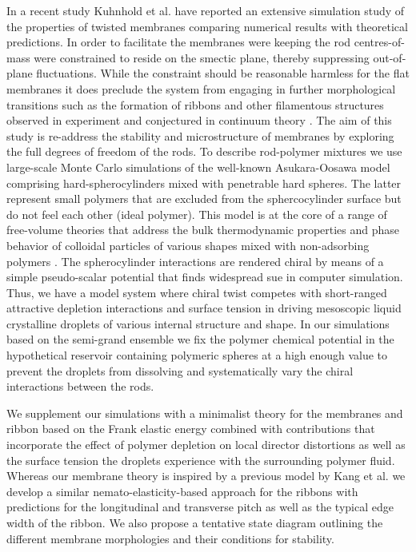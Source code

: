 In a recent study Kuhnhold et al. \cite{kuhnhold2022colloidal} have reported an extensive simulation study of the properties of twisted membranes comparing numerical results with theoretical predictions. In order to facilitate the membranes were keeping the rod centres-of-mass were constrained to reside on the smectic plane, thereby suppressing out-of-plane fluctuations. While the constraint should be reasonable harmless for the flat membranes it does preclude the system from engaging in further morphological transitions such as the formation of ribbons and other filamentous structures observed in experiment \cite{Gibaud2012} and conjectured in continuum theory \cite{kaplan2010theory,kang_sm2016}. The aim of this study is re-address the stability and microstructure of membranes by exploring the full degrees of freedom of the rods. To describe rod-polymer mixtures we use large-scale Monte Carlo simulations of the well-known Asukara-Oosawa model comprising hard-spherocylinders mixed with penetrable hard spheres. The latter represent small polymers that are excluded from the sphercocylinder surface but do not feel each other (ideal polymer). This model is at the core of a range of free-volume theories that address the bulk thermodynamic properties and phase behavior of colloidal particles of  various shapes mixed with non-adsorbing polymers \cite{LekkerkerkerTuinier2011}. The spherocylinder interactions are rendered chiral by means of a simple pseudo-scalar potential that finds widespread sue in computer simulation. Thus, we have a model system where chiral twist competes with short-ranged attractive depletion interactions and surface tension in driving mesoscopic liquid crystalline droplets of various internal structure and shape.  In our simulations based on the semi-grand ensemble we fix the polymer chemical potential in the hypothetical reservoir containing polymeric spheres at a high enough value to prevent the droplets from dissolving and systematically vary the chiral interactions between the rods.

We supplement our simulations with a minimalist theory for the membranes and ribbon based on the Frank elastic energy combined with contributions that incorporate the effect of polymer depletion on local director distortions as well as the surface tension the droplets experience with the surrounding polymer fluid. Whereas our membrane theory is inspired by a previous model by Kang et al. \cite{kang_sm2016,kang2017chiral} we develop a similar nemato-elasticity-based  approach for the ribbons with predictions for the longitudinal and transverse pitch as well as the typical edge width of the ribbon. We also propose a tentative state diagram outlining the different membrane morphologies and their conditions for stability.

